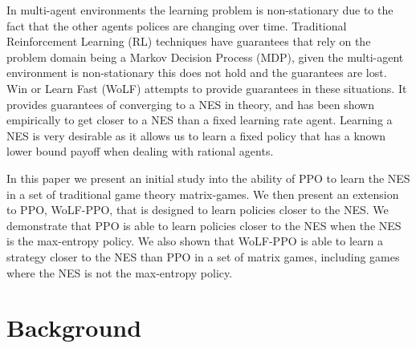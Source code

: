 \documentclass[conference]{IEEEtran}
\begin{document}
In multi-agent environments the learning problem is non-stationary due to the fact that the other agents polices are changing over time. Traditional Reinforcement Learning (RL) techniques have guarantees that rely on the problem domain being a Markov Decision Process (MDP), given the multi-agent environment is non-stationary this does not hold and the guarantees are lost. Win or Learn Fast (WoLF) attempts to provide guarantees in these situations\cite{bowling2002multiagent}. It provides guarantees of converging to a NES in theory, and has been shown empirically to get closer to a NES than a fixed learning rate agent. Learning a NES is very desirable as it allows us to learn a fixed policy that has a known lower bound payoff when dealing with rational agents.

In this paper we present an initial study into the ability of PPO to learn the NES in a set of traditional game theory matrix-games. We then present an extension to PPO, WoLF-PPO, that is designed to learn policies closer to the NES. We demonstrate that PPO is able to learn policies closer to the NES when the NES is the max-entropy policy. We also shown that WoLF-PPO is able to learn a strategy closer to the NES than PPO in a set of matrix games, including games where the NES is not the max-entropy policy.

\section{Background}


\end{document}
